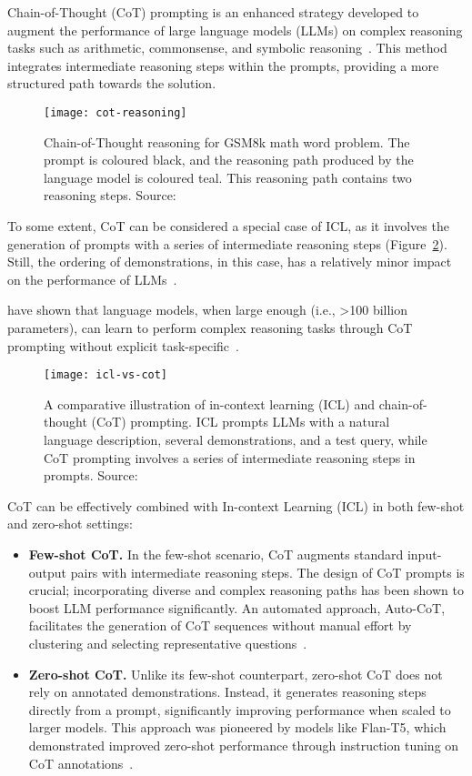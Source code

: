 Chain-of-Thought (CoT) prompting is an enhanced strategy developed to augment the performance of large language models (LLMs) on complex reasoning tasks such as arithmetic, commonsense, and symbolic reasoning~\cite{wei2022chain, miao2021diverse, talmor2019commonsenseqa}.
This method integrates intermediate reasoning steps within the prompts, providing a more structured path towards the solution.
\begin{figure}[h!]
	\centering
	\texttt{[image: cot-reasoning]}
	\caption{Chain-of-Thought reasoning for GSM8k math word problem. The prompt is coloured black, and the reasoning path produced by the language model is coloured teal. This reasoning path contains two reasoning steps. Source: \textcite{li2022making}}
	\label{fig:cot-reasoning}
\end{figure}
To some extent, CoT can be considered a special case of ICL, as it involves the generation of prompts with a series of intermediate reasoning steps (Figure~\ref{fig:chain-of-thought}). Still, the ordering of demonstrations, in this case, has a relatively minor impact on the performance of LLMs~\cite{wei2022chain}.

\textcite{wei2022chain, wang2022self} have shown that language models, when large enough (i.e., \textgreater 100 billion parameters), can learn to perform complex reasoning tasks through CoT prompting without explicit task-specific~\cite{wei2022emergent}.

\begin{figure}[h!]
	\centering
	\texttt{[image: icl-vs-cot]}
	\caption{A comparative illustration of in-context learning (ICL) and chain-of-thought (CoT) prompting. ICL prompts LLMs with a natural language description, several demonstrations, and a test query, while CoT prompting involves a series of intermediate reasoning steps in prompts. Source: \textcite{survey}}
	\label{fig:chain-of-thought}
\end{figure}

CoT can be effectively combined with In-context Learning (ICL) in both few-shot and zero-shot settings:
\begin{itemize}
	\item \textbf{Few-shot CoT.} {In the few-shot scenario, CoT augments standard input-output pairs with intermediate reasoning steps.
		      The design of CoT prompts is crucial; incorporating diverse and complex reasoning paths has been shown to boost LLM performance significantly.
		      An automated approach, Auto-CoT, facilitates the generation of CoT sequences without manual effort by clustering and selecting representative questions~\cite{zhang2022automatic}.
	      }
	\item \textbf{Zero-shot CoT.} {Unlike its few-shot counterpart, zero-shot CoT does not rely on annotated demonstrations.
		      Instead, it generates reasoning steps directly from a prompt, significantly improving performance when scaled to larger models.
		      This approach was pioneered by models like Flan-T5, which demonstrated improved zero-shot performance through instruction tuning on CoT annotations~\cite{chung2022scaling}.
	      }
\end{itemize}

